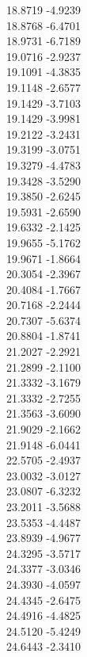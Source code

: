 {    18.8719	-4.9239\\
    18.8768	-6.4701\\
    18.9731	-6.7189\\
    19.0716	-2.9237\\
    19.1091	-4.3835\\
    19.1148	-2.6577\\
    19.1429	-3.7103\\
    19.1429	-3.9981\\
    19.2122	-3.2431\\
    19.3199	-3.0751\\
    19.3279	-4.4783\\
    19.3428	-3.5290\\
    19.3850	-2.6245\\
    19.5931	-2.6590\\
    19.6332	-2.1425\\
    19.9655	-5.1762\\
    19.9671	-1.8664\\
    20.3054	-2.3967\\
    20.4084	-1.7667\\
    20.7168	-2.2444\\
    20.7307	-5.6374\\
    20.8804	-1.8741\\
    21.2027	-2.2921\\
    21.2899	-2.1100\\
    21.3332	-3.1679\\
    21.3332	-2.7255\\
    21.3563	-3.6090\\
    21.9029	-2.1662\\
    21.9148	-6.0441\\
    22.5705	-2.4937\\
    23.0032	-3.0127\\
    23.0807	-6.3232\\
    23.2011	-3.5688\\
    23.5353	-4.4487\\
    23.8939	-4.9677\\
    24.3295	-3.5717\\
    24.3377	-3.0346\\
    24.3930	-4.0597\\
    24.4345	-2.6475\\
    24.4916	-4.4825\\
    24.5120	-5.4249\\
    24.6443	-2.3410\\
}
